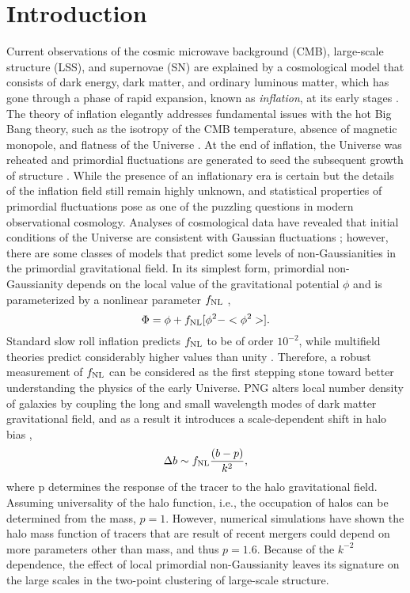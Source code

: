 \section{Introduction}
\label{sec:introduction}
Current observations of the cosmic microwave background (CMB), large-scale structure (LSS), and supernovae (SN) are explained by a cosmological model that consists of dark energy, dark matter, and ordinary luminous matter, which has gone through a phase of rapid expansion, known as \textit{inflation},  at its early stages \citep[see, e.g.,][]{weinberg2013observational}. The theory of inflation elegantly addresses fundamental issues with the hot Big Bang theory, such as the isotropy of the CMB temperature, absence of magnetic monopole, and flatness of the Universe . At the end of inflation, the Universe was reheated and primordial fluctuations are generated to seed the subsequent growth of structure . While the presence of an inflationary era is certain but the details of the inflation field still remain highly unknown, and statistical properties of primordial fluctuations pose as one of the puzzling questions in modern observational cosmology. Analyses of cosmological data have revealed that initial conditions of the Universe are consistent with Gaussian fluctuations ; however, there are some classes of models that predict some levels of non-Gaussianities in the primordial gravitational field. In its simplest form, primordial non-Gaussianity depends on the local value of the gravitational potential $\phi$ and is parameterized by a nonlinear parameter $f_{\rm NL}$ \citep{komatsu2001acoustic},
\begin{equation}
    \Phi = \phi + f_{\rm NL} [\phi^{2} -  <\phi^{2}>].
\end{equation}
Standard slow roll inflation predicts $f_{\rm NL}$ to be of order $10^{-2}$, while multifield theories predict considerably higher values than unity . Therefore, a robust measurement of $f_{\rm NL}$ can be considered as the first stepping stone toward better understanding the physics of the early Universe.  PNG alters local number density of galaxies by coupling the long and small wavelength modes of dark matter gravitational field, and as a result it introduces a scale-dependent shift in halo bias \citep[see, e.g.,][]{dalal2008imprints, slosar2008constraints},
\begin{equation}
\Delta b \sim f_{\rm NL} \frac{(b - p)}{k^{2}},
\end{equation}
where p determines the response of the tracer to the halo gravitational field. Assuming universality of the halo function, i.e., the occupation of halos can be determined from the mass, $p=1$. However, numerical simulations have shown the halo mass function of tracers that are result of recent mergers could depend on more parameters other than mass, and thus $p=1.6$.  Because of the $k^{-2}$ dependence, the effect of local primordial non-Gaussianity leaves its signature on the large scales in the two-point clustering of large-scale structure. 

